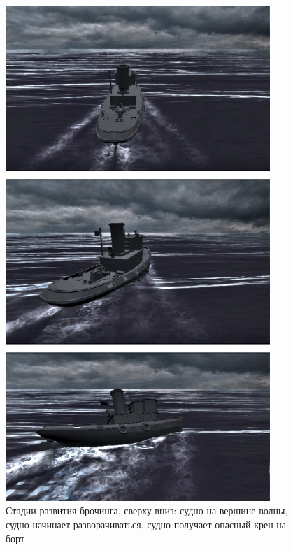 \begin{figure}
\begin{center}
	\includegraphics[width=100mm]{images/exp_broaching2/shots/movie}
	\caption{Стадии развития брочинга, сверху вниз: судно на вершине волны, судно начинает разворачиваться, судно получает опасный крен на борт}
	\label{exp:broaching_movie}
\end{center}
\end{figure}









